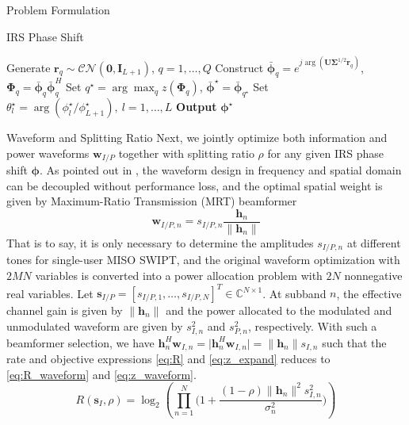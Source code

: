 \documentclass[journal]{IEEEtran}
\begin{document}
\begin{section}{Problem Formulation}
\begin{subsection}{IRS Phase Shift}
\begin{algorithm}
\begin{algorithmic}[1]
					\State Generate $\boldsymbol{r}_q \sim \mathcal{CN}(\boldsymbol{0},\boldsymbol{I}_{L+1})$, $q=1,\dots,Q$
					\State Construct $\bar{\boldsymbol{\phi}}_q=e^{j\arg\left(\boldsymbol{U}\boldsymbol{\Sigma}^{1/2}\boldsymbol{r}_q\right)}$, $\boldsymbol{\Phi}_q=\bar{\boldsymbol{\phi}}_q\bar{\boldsymbol{\phi}}_q^H$
					\State Set $q^{\star}=\arg\max_q{z(\boldsymbol{\Phi}_q)}$, $\bar{\boldsymbol{\phi}}^\star=\bar{\boldsymbol{\phi}}_{q^{\star}}$
				\EndIf
				\State Set $\theta_l^\star=\arg(\phi_l^\star/\phi_{L+1}^\star), \ l=1,\dots,L$
				\State \textbf{Output} $\boldsymbol{\phi}^{\star}$
			\end{algorithmic}
		\end{algorithm}
	\end{subsection}

	\begin{subsection}{Waveform and Splitting Ratio}
		Next, we jointly optimize both information and power waveforms $\boldsymbol{w}_{I/P}$ together with splitting ratio $\rho$ for any given IRS phase shift $\boldsymbol{\phi}$. As pointed out in \cite{Clerckx2018b}, the waveform design in frequency and spatial domain can be decoupled without performance loss, and the optimal spatial weight is given by Maximum-Ratio Transmission (MRT) beamformer
		\begin{equation}\label{eq:w_IP}
			\boldsymbol{w}_{I/P,n}=s_{I/P,n}\frac{\boldsymbol{h}_n}{\lVert{\boldsymbol{h}_n}\rVert}
		\end{equation}
		That is to say, it is only necessary to determine the amplitudes $s_{I/P,n}$ at different tones for single-user MISO SWIPT, and the original waveform optimization with $2MN$ variables is converted into a power allocation problem with $2N$ nonnegative real variables. Let $\boldsymbol{s}_{I/P}=[s_{I/P,1},\dots,s_{I/P,N}]^T \in \mathbb{C}^{N \times 1}$. At subband $n$, the effective channel gain is given by $\lVert{\boldsymbol{h}_n}\rVert$ and the power allocated to the modulated and unmodulated waveform are given by $s_{I,n}^2$ and $s_{P,n}^2$, respectively. With such a beamformer selection, we have $\boldsymbol{h}_n^H\boldsymbol{w}_{I,n}=\lvert{\boldsymbol{h}_n^H\boldsymbol{w}_{I,n}}\rvert=\lVert{\boldsymbol{h}_n}\rVert s_{I,n}$ such that the rate and objective expressions \ref{eq:R} and \ref{eq:z_expand} reduces to \ref{eq:R_waveform} and \ref{eq:z_waveform}.
		\begin{equation}\label{eq:R_waveform}
			R(\boldsymbol{s}_I,\rho) = \log_2\left(\prod_{n=1}^N\biggl(1+\frac{(1-\rho)\lVert{\boldsymbol{h}_n}\rVert^2 s_{I,n}^2}{\sigma_n^2}\biggr)\right)

\end{equation}
\end{subsection}
\end{section}
\end{document}
